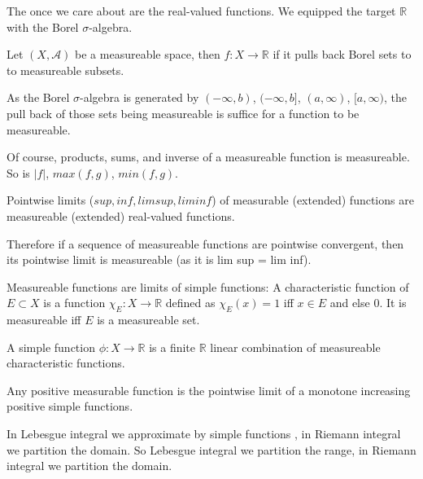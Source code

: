 \documentclass[main.tex]{subfiles}
\begin{document}
The once we care about are the real-valued functions. We equipped the target $\mathbb{R}$ with the Borel $\sigma$-algebra. 

\begin{definition}
Let $(X, \mathcal{A})$ be a measureable space, then $f : X \rightarrow \mathbb{R}$ if it pulls back Borel sets to to measureable subsets.
\end{definition}

As the Borel $\sigma$-algebra is generated by $(-\infty, b)$, $(-\infty, b]$, $(a, \infty)$, $[a, \infty)$, the pull back of those sets being measureable is suffice for a function to be measureable.

Of course, products, sums, and inverse of a measureable function is measureable. So is $|f|$, $max(f,g)$, $min(f, g)$.




\begin{lemma}

Pointwise limits ($sup, inf, lim sup, lim inf$) of measurable (extended) functions are measureable (extended) real-valued functions. 
\end{lemma}

Therefore if a sequence of measureable functions are pointwise convergent, then its pointwise limit is measureable (as it is lim sup = lim inf).

Measureable functions are limits of simple functions:
A characteristic function of $E \subset X$ is a function $\chi_E: X \rightarrow \mathbb{R}$ defined as $\chi_E(x) = 1$ iff $x \in E$ and else $0$. It is measureable iff $E$ is a measureable set.

\begin{definition}
A simple function $\phi: X \rightarrow \mathbb{R}$ is a finite $\mathbb{R}$ linear combination of measureable characteristic functions.
\end{definition}


\begin{theorem}
Any positive measurable function is the pointwise limit of a monotone increasing positive simple functions. 
\end{theorem}

\begin{remark}
In Lebesgue integral we approximate by simple functions , in Riemann integral we partition the domain. So Lebesgue integral we partition the range, in Riemann integral we partition the domain.
\end{remark}
\end{document}
